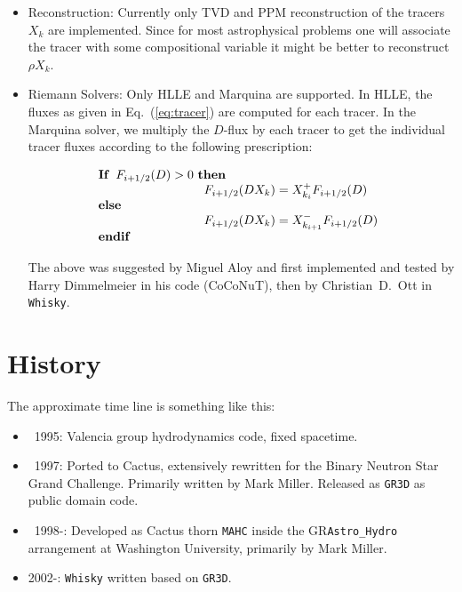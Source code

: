 \documentclass{article}
\begin{document}
\begin{itemize}
  \item Reconstruction: Currently only TVD and PPM reconstruction of the
    tracers $X_k$ are implemented. Since for most astrophysical problems one
    will associate the tracer with some compositional variable it might
    be better to reconstruct $\rho X_k$.

  \item Riemann Solvers: Only HLLE and Marquina are supported. In HLLE,
    the fluxes as given in Eq.~(\ref{eq:tracer}) are computed for each tracer.
    In the Marquina solver, we multiply the $D$-flux by each tracer to get
    the individual tracer fluxes according to the following prescription:

    \begin{equation}
      \label{eq:marquinatracer}
      \begin{array}[l]{l}
	{\bf If}\ \, F_{i+1/2} (D) > 0 \,\, {\bf then} \\
	  \qquad \qquad \begin{array}[c]{l}
	    \qquad \qquad F_{i+1/2} (D X_k) = X_{k_i}^+ F_{i+1/2} (D)
	  \end{array} \\
		 {\bf else} \\
		 \qquad \qquad \begin{array}[c]{r c l}
		   \qquad \qquad F_{i+1/2} (D X_k) = X_{k_{i+1}}^- F_{i+1/2} (D)
		 \end{array} \\
			{\bf end if} \\
      \end{array} \\
    \end{equation}

    The above was suggested by Miguel Aloy and first implemented and
    tested by Harry Dimmelmeier in his code (CoCoNuT), then by Christian~D.~Ott
    in {\tt Whisky}.

\end{itemize}


\section{History}

The approximate time line is something like this:
\begin{itemize}
\item ~1995: Valencia group hydrodynamics code, fixed spacetime.
\item ~1997: Ported to Cactus, extensively rewritten for the Binary
  Neutron Star Grand Challenge. Primarily written by Mark Miller.
  Released as {\tt GR3D} as public domain code.
\item ~1998-: Developed as Cactus thorn {\tt MAHC} inside the
  GR{\tt Astro\_Hydro} arrangement at Washington University, primarily by
  Mark Miller.
\item 2002-: {\tt Whisky} written based on {\tt GR3D}.
\end{itemize}
\end{document}
